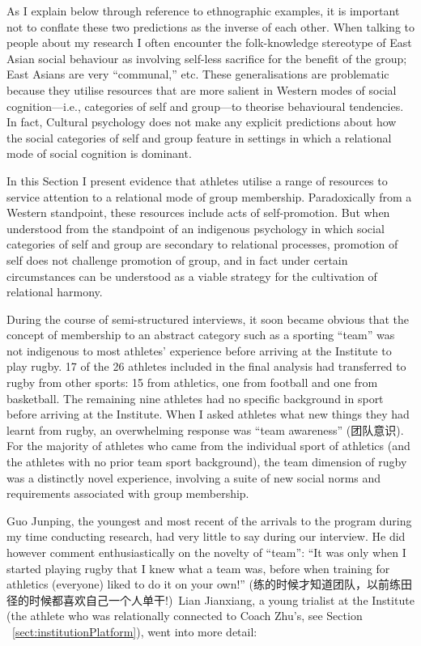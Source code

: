 \begin{CJK}{UTF8}{gbsn}
As I explain below through reference to ethnographic examples, it is important not to conflate these two predictions as the inverse of each other.  When talking to people about my research I often encounter the folk-knowledge stereotype of East Asian social behaviour as involving self-less sacrifice for the benefit of the group; East Asians are very ``communal,'' etc.  These generalisations are problematic because they utilise resources that are more salient in Western modes of social cognition---i.e., categories of self and group---to theorise behavioural tendencies.  In fact, Cultural psychology does not make any explicit predictions about how the social categories of self and group feature in settings in which a relational mode of social cognition is dominant.

In this Section I present evidence that athletes utilise a range of resources to service attention to a relational mode of group membership.  Paradoxically from a Western standpoint, these resources include acts of self-promotion.  But when understood from the standpoint of an indigenous psychology in which social categories of self and group are secondary to relational processes, promotion of self does not challenge promotion of group, and in fact under certain circumstances can be understood as a viable strategy for the cultivation of relational harmony.




During the course of semi-structured interviews, it soon became obvious that the concept of membership to an abstract category such as a sporting ``team'' was not indigenous to most athletes' experience before arriving at the Institute to play rugby.  17 of the 26 athletes included in the final analysis had transferred to rugby from other sports: 15 from athletics, one from football and one from basketball.  The remaining nine athletes had no specific background in sport before arriving at the Institute.  When I asked athletes what new things they had learnt from rugby, an overwhelming response was ``team awareness'' (团队意识).  For the majority of athletes who came from the individual sport of athletics (and the athletes with no prior team sport background), the team dimension of rugby was a distinctly novel experience, involving a suite of new social norms and requirements associated with group membership.

Guo Junping, the youngest and most recent of the arrivals to the program during my time conducting research, had very little to say during our interview. He did however comment enthusiastically on the novelty of ``team'': ``It was only when I started playing rugby that I knew what a team was, before when training for athletics (everyone) liked to do it on your own!'' (练的时候才知道团队，以前练田径的时候都喜欢自己一个人单干!) Lian Jianxiang, a young trialist at the Institute (the athlete who was relationally connected to Coach Zhu's, see Section ~\ref{sect:institutionPlatform}), went into more detail:


\end{CJK}
